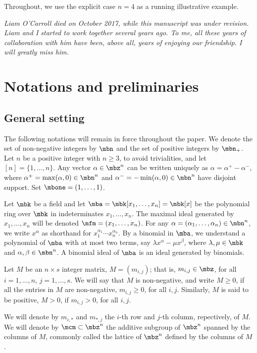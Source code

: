Throughout, we use the explicit case $n=4$ as a running illustrative
example.

\bigskip 

\textit{Liam O'Carroll died on October 2017, while this manuscript was under
revision. Liam and I started to work together several years ago. To
me, all these years of collaboration with him have been, above all,
years of enjoying our friendship. I will greatly miss him.}


\section{Notations and preliminaries}\label{preliminaries}

\subsection{General setting}\label{general}

The following notations will remain in force throughout the paper.  We
denote the set of non-negative integers by $\mbn$ and the set of
positive integers by $\mbn_+$. Let $n$ be a positive integer with
$n\geq 3$, to avoid trivialities, and let $[n]=\{1,\ldots ,n\}$. Any
vector $\alpha\in\mbz^n$ can be written uniquely as
$\alpha=\alpha^+-\alpha^-$, where $\alpha^+=\max(\alpha,0)\in\mbn^n$
and $\alpha^-=-\min(\alpha,0)\in\mbn^n$ have disjoint support. Set
$\mbone=(1,\ldots ,1)$. 

Let $\mbk$ be a field and let $\mba=\mbk[x_1,\ldots ,x_n]=\mbk[x]$ be the
polynomial ring over $\mbk$ in indeterminates $x_1,\ldots ,x_n$. The
maximal ideal generated by $x_1,\ldots ,x_n$ will be denoted
$\mfm=(x_1,\ldots ,x_n)$.  For any $\alpha=(\alpha_1,\ldots
,\alpha_n)\in\mbn^n$, we write $x^\alpha$ as shorthand for
$x_1^{\alpha_1}\cdots x_n^{\alpha_n}$. By a binomial in $\mba$, we
understand a polynomial of $\mba$ with at most two terms, say $\lambda
x^\alpha-\mu x^\beta$, where $\lambda, \mu\in\mbk$ and
$\alpha,\beta\in\mbn^{n}$. A binomial ideal of $\mba$ is an ideal
generated by binomials.

Let $M$ be an $n\times s$ integer matrix, $M=(m_{i,j})$; that is,
$m_{i,j}\in\mbz$, for all $i=1,\ldots ,n$, $j=1,\ldots ,s$. We will
say that $M$ is non-negative, and write $M\geq 0$, if all the entries
in $M$ are non-negative, \ie $m_{i,j}\geq 0$, for all
$i,j$. Similarly, $M$ is said to be positive, $M>0$, if $m_{i,j}>0$,
for all $i,j$.

We will denote by $m_{i,*}$ and $m_{*,j}$ the $i$-th row and $j$-th
column, repectively, of $M$. We will denote by $\mcm\subset \mbz^n$
the additive subgroup of $\mbz^n$ spanned by the columns of $M$,
commonly called the lattice of $\mbz^{n}$ defined by the columns of
$M$.

